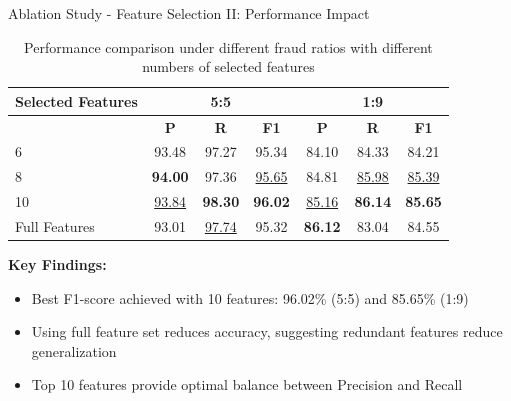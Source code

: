 \documentclass{beamer}
\begin{document}
\begin{frame}{Ablation Study - Feature Selection II: Performance Impact}
    \begin{table}
        \centering
        \tiny
        \caption{Performance comparison under different fraud ratios with different numbers of selected features}
        \begin{tabular}{lccc|ccc}
            \hline
            \textbf{Selected Features} & \multicolumn{3}{c|}{\textbf{5:5}} & \multicolumn{3}{c}{\textbf{1:9}} \\
            \hline
             & \textbf{P} & \textbf{R} & \textbf{F1} & \textbf{P} & \textbf{R} & \textbf{F1} \\
            \hline
            6 & 93.48 & 97.27 & 95.34 & 84.10 & 84.33 & 84.21 \\
            8 & \textbf{94.00} & 97.36 & \underline{95.65} & 84.81 & \underline{85.98} & \underline{85.39} \\
            10 & \underline{93.84} & \textbf{98.30} & \textbf{96.02} & \underline{85.16} & \textbf{86.14} & \textbf{85.65} \\
            Full Features & 93.01 & \underline{97.74} & 95.32 & \textbf{86.12} & 83.04 & 84.55 \\
            \hline
        \end{tabular}
    \end{table}
    
    \vspace{0.3cm}
    \textbf{Key Findings:}
    \begin{itemize}
        \item Best F1-score achieved with 10 features: 96.02\% (5:5) and 85.65\% (1:9)
        \item Using full feature set reduces accuracy, suggesting redundant features reduce generalization
        \item Top 10 features provide optimal balance between Precision and Recall
    \end{itemize}
\end{frame}
\end{document}
